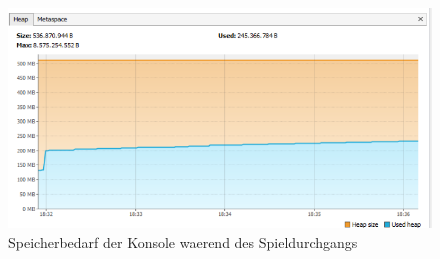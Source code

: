 \documentclass{article}
\begin{document}
\begin{figure}
  \centering
  \includegraphics{Memory_console_execute.png}
  \caption{Speicherbedarf der Konsole waerend des Spieldurchgangs}
  \label{fig:Console_mem_Execute}
\end{figure}
\end{document}
